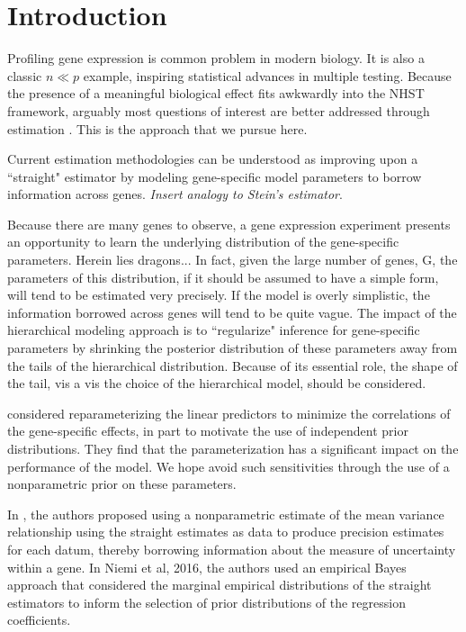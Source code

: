 \newcommand{\op}{\operatorname}
\newcommand{\ind}{\stackrel{ind.}{\sim}}
\section{Introduction}
Profiling gene expression is common problem in modern biology. It is also a classic $n \ll p$ example, inspiring statistical advances in multiple testing. Because the presence of a meaningful biological effect fits awkwardly into the NHST framework, arguably most questions of interest are better addressed through estimation \citet{deseq2014}. This is the approach that we pursue here.

Current estimation methodologies can be understood as improving upon a ``straight" estimator by modeling gene-specific model parameters to borrow information across genes. \textit{Insert analogy to Stein's estimator}.

Because there are many genes to observe, a gene expression experiment presents an opportunity to learn the underlying distribution of the gene-specific parameters. Herein lies dragons... In fact, given the large number of genes, G, the parameters of this distribution, if it should be assumed to have a simple form, will tend to be estimated very precisely. If the model is overly simplistic, the information borrowed across genes will tend to be quite vague. The impact of the hierarchical modeling approach is to ``regularize" inference for gene-specific parameters by shrinking the posterior distribution of these parameters away from the tails of the hierarchical distribution. Because of its essential role, the shape of the tail, vis a vis the choice of the hierarchical model, should be considered.

\citet*{lithio} considered reparameterizing the linear predictors to minimize the correlations of the gene-specific effects, in part to motivate the use of independent prior distributions. They find that the parameterization has a significant impact on the performance of the model. We hope avoid such sensitivities through the use of a nonparametric prior on these parameters.

In \citet{voom}, the authors proposed using a nonparametric estimate of the mean variance relationship using the straight estimates as data to produce precision estimates for each datum, thereby borrowing information about the measure of uncertainty within a gene. In Niemi et al, 2016, the authors used an empirical Bayes approach that considered the marginal empirical distributions of the straight estimators to inform the selection of prior distributions of the regression coefficients.


